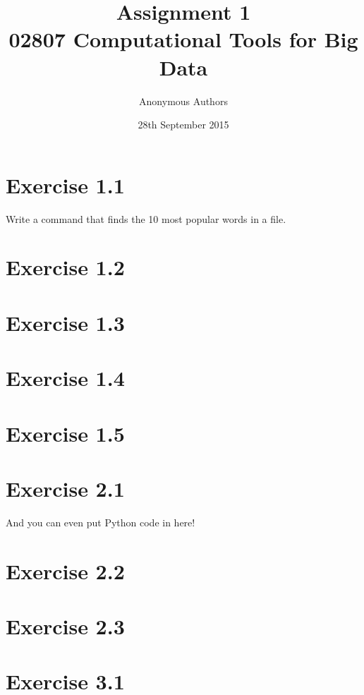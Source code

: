 \documentclass{article}
\title{Assignment 1\\02807 Computational Tools for Big Data}
\author{Anonymous Authors}
\date{28th September 2015}
\begin{document}
\maketitle

\section{Exercise 1.1}
Write a command that finds the 10 most popular words in a file.


\section{Exercise 1.2}


\section{Exercise 1.3}



\section{Exercise 1.4}
\section{Exercise 1.5}

\section{Exercise 2.1}
And you can even put Python code in here!



\section{Exercise 2.2}


\section{Exercise 2.3}


\section{Exercise 3.1}

\end{document}
